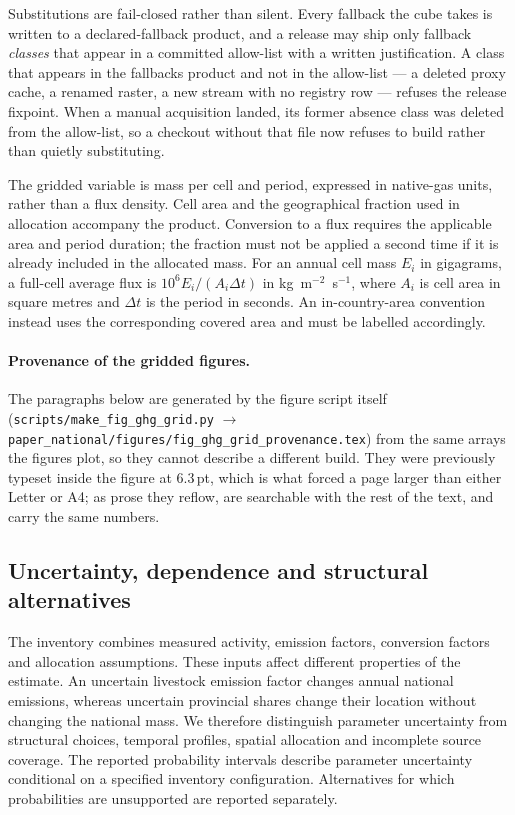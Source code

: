 \documentclass[essd]{copernicus}
\begin{document}
Substitutions are fail-closed rather than silent. Every fallback the cube takes is written to a declared-fallback product, and a release may ship only fallback \emph{classes} that appear in a committed allow-list with a written justification. A class that appears in the fallbacks product and not in the allow-list --- a deleted proxy cache, a renamed raster, a new stream with no registry row --- refuses the release fixpoint. When a manual acquisition landed, its former absence class was deleted from the allow-list, so a checkout without that file now refuses to build rather than quietly substituting.

The gridded variable is mass per cell and period, expressed in native-gas units, rather than a flux density. Cell area and the geographical fraction used in allocation accompany the product. Conversion to a flux requires the applicable area and period duration; the fraction must not be applied a second time if it is already included in the allocated mass. For an annual cell mass $E_i$ in gigagrams, a full-cell average flux is $10^6E_i/(A_i\Delta t)$ in kg~m$^{-2}$~s$^{-1}$, where $A_i$ is cell area in square metres and $\Delta t$ is the period in seconds. An in-country-area convention instead uses the corresponding covered area and must be labelled accordingly.

\paragraph{Provenance of the gridded figures.}
The paragraphs below are generated by the figure script itself
(\texttt{scripts/make\_fig\_ghg\_grid.py} $\rightarrow$
\texttt{paper\_national/figures/fig\_ghg\_grid\_provenance.tex}) from the same arrays the
figures plot, so they cannot describe a different build. They were previously typeset inside
the figure at 6.3\,pt, which is what forced a page larger than either Letter or A4; as prose
they reflow, are searchable with the rest of the text, and carry the same numbers.

\GridProvenance{}

\subsection{Uncertainty, dependence and structural alternatives}
\label{sec:uncertainty_methods}

The inventory combines measured activity, emission factors, conversion factors and allocation assumptions. These inputs affect different properties of the estimate. An uncertain livestock emission factor changes annual national emissions, whereas uncertain provincial shares change their location without changing the national mass. We therefore distinguish parameter uncertainty from structural choices, temporal profiles, spatial allocation and incomplete source coverage. The reported probability intervals describe parameter uncertainty conditional on a specified inventory configuration. Alternatives for which probabilities are unsupported are reported separately.
\end{document}
